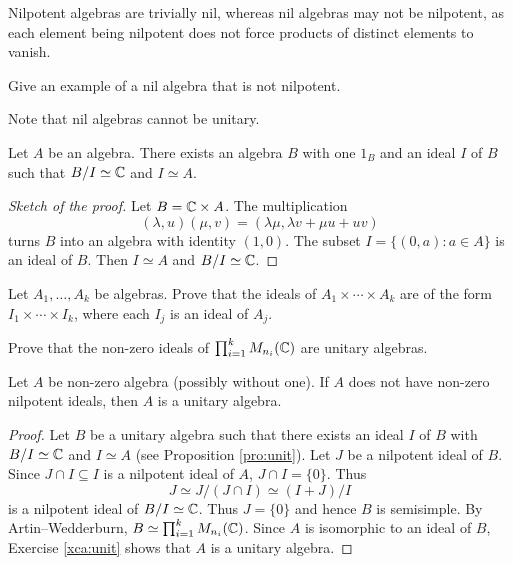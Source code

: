 Nilpotent algebras are trivially nil, whereas nil algebras may not be nilpotent, as each element being nilpotent does not force products of distinct elements to vanish.

\begin{exercise}
    Give an example of a nil algebra that is not nilpotent. 
\end{exercise}

Note that nil algebras cannot be unitary. 

\begin{proposition}
\label{pro:unit}
    Let $A$ be an algebra. There exists an algebra $B$ 
    with one $1_B$ and an ideal $I$ of $B$ 
    such that $B/I\simeq\mathbb{C}$ and $I\simeq A$. 
\end{proposition}

\begin{proof}[Sketch of the proof]
    Let $B=\mathbb{C}\times A$. The multiplication  
    \[
    (\lambda,u)(\mu,v)=(\lambda\mu,\lambda v+\mu u+uv)
    \]
    turns $B$ into an algebra with identity $(1,0)$. The subset
    $I=\{(0,a):a\in A\}$ is an ideal of $B$. Then $I\simeq A$ 
    and $B/I\simeq\mathbb{C}$. 
\end{proof}

\begin{exercise}
Let $A_1,\dots,A_k$ be algebras. 
Prove that the ideals of $A_1\times\cdots\times A_k$ 
are of the form $I_1\times\cdots\times I_k$, where
each $I_j$ is an ideal of $A_j$.  
\end{exercise}

\begin{exercise}
\label{xca:unit}
    Prove that the non-zero ideals of 
    $\prod_{i=1}^k M_{n_i}(\mathbb{C})$ are unitary algebras.  
\end{exercise}

\begin{proposition}
    Let $A$ be non-zero algebra (possibly without one). If $A$ 
    does not have non-zero nilpotent 
    ideals, then $A$ is a unitary algebra. 
\end{proposition}

\begin{proof}
    Let $B$ be a unitary algebra such that there exists
    an ideal $I$ of $B$ with $B/I\simeq\mathbb{C}$ and $I\simeq A$ 
    (see Proposition \ref{pro:unit}). Let $J$ be 
    a nilpotent ideal of $B$. Since $J\cap I\subseteq I$ is a nilpotent
    ideal of $A$, 
    $J\cap I=\{0\}$. Thus 
    \[
    J\simeq J/(J\cap I)\simeq (I+J)/I
    \]
    is a nilpotent ideal of $B/I\simeq\mathbb{C}$. Thus $J=\{0\}$ 
    and hence $B$ is semisimple. By Artin--Wedderburn, 
    $B\simeq\prod_{i=1}^k M_{n_i}(\mathbb{C})$. Since $A$ is isomorphic to an ideal of 
    $B$, Exercise \ref{xca:unit} shows
    that $A$ is a unitary algebra. 
\end{proof}

